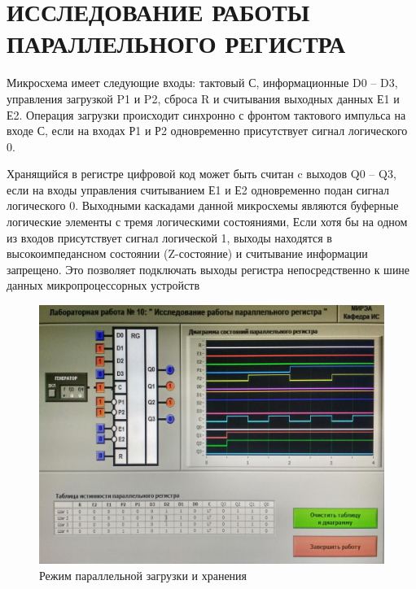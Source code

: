 \section{ИССЛЕДОВАНИЕ РАБОТЫ ПАРАЛЛЕЛЬНОГО РЕГИСТРА}

Микросхема имеет следующие входы:
тактовый С,
информационные D0 – D3,
управления загрузкой P1 и P2,
сброса R и считывания выходных данных Е1 и Е2.
Операция загрузки происходит синхронно с фронтом тактового импульса на входе С,
если на входах Р1 и Р2 одновременно присутствует сигнал логического 0.

Хранящийся в регистре цифровой код может быть считан c выходов
Q0 – Q3, если на входы управления считыванием Е1 и Е2 одновременно
подан сигнал логического 0. Выходными каскадами данной микросхемы
являются буферные логические элементы с тремя логическими
состояниями, Если хотя бы на одном из входов присутствует сигнал
логической 1, выходы находятся в высокоимпедансном состоянии (Z-состояние) и считывание информации запрещено. Это позволяет
подключать выходы регистра непосредственно к шине данных
микропроцессорных устройств

\begin{figure}[H]
	\centering
	\includegraphics[width=0.95\linewidth]{imgs/10/1.jpg}
	\caption{Режим параллельной загрузки и хранения}
	\label{fig:10_1}
\end{figure}

